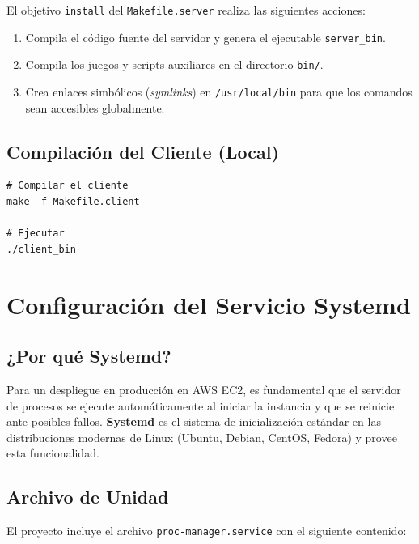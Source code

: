 \documentclass[12pt,a4paper]{report}
\begin{document}
El objetivo \texttt{install} del \texttt{Makefile.server} realiza las siguientes acciones:
\begin{enumerate}[leftmargin=1.5em]
  \item Compila el código fuente del servidor y genera el ejecutable \texttt{server\_bin}.
  \item Compila los juegos y scripts auxiliares en el directorio \texttt{bin/}.
  \item Crea enlaces simbólicos (\textit{symlinks}) en \texttt{/usr/local/bin} para que los comandos sean accesibles globalmente.
\end{enumerate}

\section{Compilación del Cliente (Local)}

\begin{tcolorbox}[colback=black!85, colframe=black, title=\textcolor{white}{\textbf{Terminal — Cliente}}]
\begin{lstlisting}[style=bashstyle, numbers=none]
# Compilar el cliente
make -f Makefile.client

# Ejecutar
./client_bin
\end{lstlisting}
\end{tcolorbox}

\chapter{Configuración del Servicio Systemd}

\section{¿Por qué Systemd?}

Para un despliegue en producción en AWS EC2, es fundamental que el servidor de procesos se ejecute automáticamente al iniciar la instancia y que se reinicie ante posibles fallos. \textbf{Systemd} es el sistema de inicialización estándar en las distribuciones modernas de Linux (Ubuntu, Debian, CentOS, Fedora) y provee esta funcionalidad.

\section{Archivo de Unidad}

El proyecto incluye el archivo \texttt{proc-manager.service} con el siguiente contenido:
\end{document}
